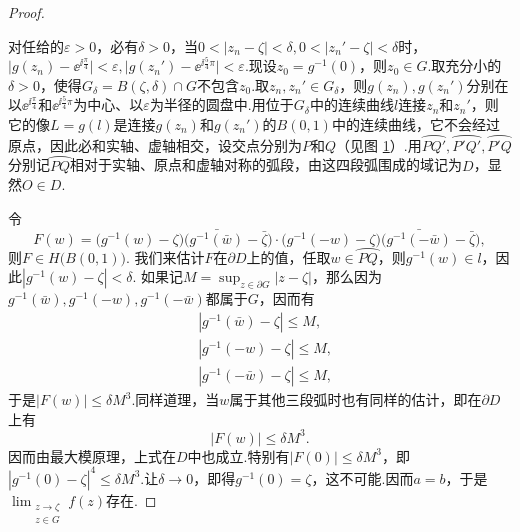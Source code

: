 \begin{proof}
\begin{figure}[!ht]
{
}
\caption{\label{fig7.2}}
\end{figure}
对任给的$\varepsilon>0$，必有$\delta>0$，当$0<|z_n-\zeta|<\delta,0<|z_n'-\zeta|<\delta $时，$\big|g(z_n)-\ee^{\ii\frac\pi4}\big|<\varepsilon,\big|g(z_n')-\ee^{\ii\frac54\pi}\big|
<\varepsilon$.现设$z_0=g^{-1}(0)$，则$z_0\in G$.取充分小的$\delta>0$，使得$G_\delta=B(\zeta,\delta)\cap G$不包含$z_0$.取$z_n,z_n'\in G_\delta$，则$g(z_n),g(z_n')$分别在以$\ee^{\ii\frac\pi4}$和$\ee^{\ii\frac54\pi}$为中心、以$\varepsilon$为半径的圆盘中.用位于$G_\delta$中的连续曲线$l$连接$z_n$和$z_n'$，则它的像$L=g(l)$是连接$g(z_n)$和$g(z_n')$的$B(0,1)$中的连续曲线，它不会经过原点，因此必和实轴、虚轴相交，设交点分别为$P$和$Q$（见图 \ref{fig7.2}）.用$\wideparen{PQ'},\wideparen{P'Q'},\wideparen{P'Q}$分别记$\wideparen{PQ}$相对于实轴、原点和虚轴对称的弧段，由这四段弧围成的域记为$D$，显然$O\in D$.

令
\[F(w)=\big(g^{-1}(w)-\zeta\big)\big(\bar{g^{-1}(\bar w)}-\bar \zeta\big)
\cdot\big(g^{-1}(-w)-\zeta\big)\big(\bar{g^{-1}(-\bar w)}-\bar \zeta\big),\]
则$F\in H\big(B(0,1)\big)$. 我们来估计$F$在$\partial D$上的值，任取$w\in\wideparen{PQ}$，则$g^{-1}(w)\in l$，因此$|g^{-1}(w)-\zeta|<\delta$. 如果记$M=\sup_{z\in\partial G}|z-\zeta|$，那么因为$g^{-1}(\bar w),g^{-1}(-w),g^{-1}(-\bar w)$都属于$G$，因而有
\begin{align*}
&|g^{-1}(\bar w)-\zeta|\le M,\\
&|g^{-1}(-w)-\zeta|\le M,\\
&|g^{-1}(-\bar w)-\zeta|\le M,
\end{align*}
于是$|F(w)|\le \delta M^3$.同样道理，当$w$属于其他三段弧时也有同样的估计，即在$\partial D$上有
\[|F(w)|\le\delta M^3.\]
因而由最大模原理，上式在$D$中也成立.特别有$|F(0)|\le\delta M^3$，即$|g^{-1}(0)-\zeta|^4\le\delta M^3$.让$\delta\to0$，即得$g^{-1}(0)=\zeta$，这不可能.因而$a=b$，于是$\lim_{\substack{z\to\zeta\\z\in G}}f(z)$存在.


\end{proof}

